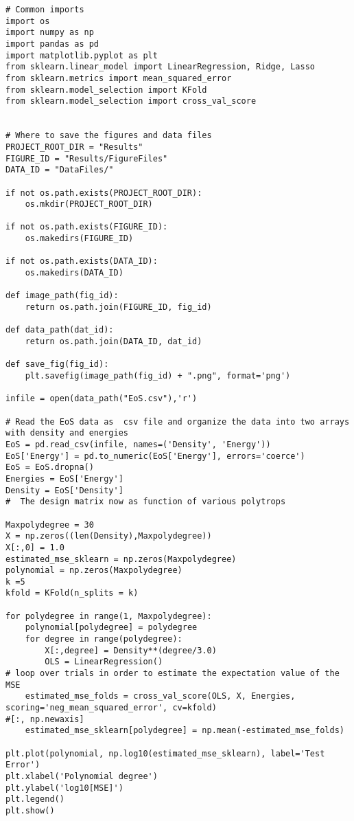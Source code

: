 \documentclass[%
oneside,                 %
final,                   %
10pt]{article}
\begin{document}
\begin{verbatim}
# Common imports
import os
import numpy as np
import pandas as pd
import matplotlib.pyplot as plt
from sklearn.linear_model import LinearRegression, Ridge, Lasso
from sklearn.metrics import mean_squared_error
from sklearn.model_selection import KFold
from sklearn.model_selection import cross_val_score


# Where to save the figures and data files
PROJECT_ROOT_DIR = "Results"
FIGURE_ID = "Results/FigureFiles"
DATA_ID = "DataFiles/"

if not os.path.exists(PROJECT_ROOT_DIR):
    os.mkdir(PROJECT_ROOT_DIR)

if not os.path.exists(FIGURE_ID):
    os.makedirs(FIGURE_ID)

if not os.path.exists(DATA_ID):
    os.makedirs(DATA_ID)

def image_path(fig_id):
    return os.path.join(FIGURE_ID, fig_id)

def data_path(dat_id):
    return os.path.join(DATA_ID, dat_id)

def save_fig(fig_id):
    plt.savefig(image_path(fig_id) + ".png", format='png')

infile = open(data_path("EoS.csv"),'r')

# Read the EoS data as  csv file and organize the data into two arrays with density and energies
EoS = pd.read_csv(infile, names=('Density', 'Energy'))
EoS['Energy'] = pd.to_numeric(EoS['Energy'], errors='coerce')
EoS = EoS.dropna()
Energies = EoS['Energy']
Density = EoS['Density']
#  The design matrix now as function of various polytrops

Maxpolydegree = 30
X = np.zeros((len(Density),Maxpolydegree))
X[:,0] = 1.0
estimated_mse_sklearn = np.zeros(Maxpolydegree)
polynomial = np.zeros(Maxpolydegree)
k =5
kfold = KFold(n_splits = k)

for polydegree in range(1, Maxpolydegree):
    polynomial[polydegree] = polydegree
    for degree in range(polydegree):
        X[:,degree] = Density**(degree/3.0)
        OLS = LinearRegression()
# loop over trials in order to estimate the expectation value of the MSE
    estimated_mse_folds = cross_val_score(OLS, X, Energies, scoring='neg_mean_squared_error', cv=kfold)
#[:, np.newaxis]
    estimated_mse_sklearn[polydegree] = np.mean(-estimated_mse_folds)

plt.plot(polynomial, np.log10(estimated_mse_sklearn), label='Test Error')
plt.xlabel('Polynomial degree')
plt.ylabel('log10[MSE]')
plt.legend()
plt.show()

\end{verbatim}
\end{document}
